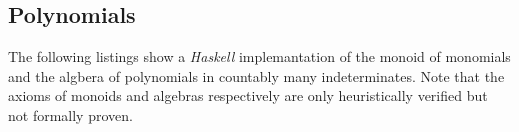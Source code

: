 \subsection{Polynomials} \label{app:polynomials}

The following listings show a \emph{Haskell} implemantation of the monoid of
monomials and the algbera of polynomials in countably many indeterminates. Note
that the axioms of monoids and algebras respectively are only heuristically
verified but not formally proven.




